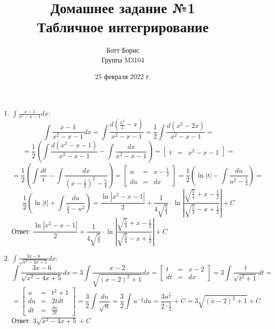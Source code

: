 \documentclass[a4paper,12pt]{article}
\title{Домашнее задание №1\\
    \large Табличное интегрирование}
\author{Ботт Борис\\
    Группа M3104}
\date{25 февраля 2022 г.}
\begin{document}
\maketitle

\begin{enumerate}
    \item $\int\frac{x - 1}{x^2 - x - 1}dx$:
    $$\int\frac{x - 1}{x^2 - x - 1}dx = \int\frac{d(\frac{x^2}{2} - x)}{x^2 - x - 1} = \frac{1}{2}\int\frac{d(x^2 - 2x)}{x^2 - x - 1} =$$
    $$= \frac{1}{2}\left(\int\frac{d(x^2 - x - 1)}{x^2 - x - 1} - \int\frac{dx}{x^2 - x - 1}\right) = \left[\begin{array}{rcl}
        t & = & x^2 - x - 1
    \end{array}\right] =$$
    $$= \frac{1}{2}\left(\int\frac{dt}{t} - \int\frac{dx}{\left(x - \frac{1}{2}\right)^2 - \frac{5}{4}}\right) = \left[\begin{array}{rcl}
        u & = & x - \frac{1}{2} \\
        du & = & dx
    \end{array}\right] = \frac{1}{2}\left(\ln|t| - \int\frac{du}{u^2 - \frac{5}{4}}\right) =$$
    $$\frac{1}{2}\left(\ln|t| + \int\frac{du}{\frac{5}{4} - u^2}\right) = \dfrac{\ln|x^2 - x - 1|}{2} + \dfrac{1}{4\sqrt{\frac{5}{4}}}\cdot\ln\left|\dfrac{\sqrt{\frac{5}{4}} + x - \frac{1}{2}}{\sqrt{\frac{5}{4}} - x + \frac{1}{2}}\right|{} + C$$
    Ответ: $\dfrac{\ln|x^2 - x - 1|}{2} + \dfrac{1}{4\sqrt{\frac{5}{4}}}\cdot\ln\left|\dfrac{\sqrt{\frac{5}{4}} + x - \frac{1}{2}}{\sqrt{\frac{5}{4}} - x + \frac{1}{2}}\right|{} + C$

    \item $\int\frac{3x - 6}{\sqrt{x^2 - 4x + 5}}dx$:
    $$\int\dfrac{3x - 6}{\sqrt{x^2 - 4x + 5}}dx = 3\int\dfrac{x - 2}{\sqrt{\left(x - 2\right)^2 + 1}}dx = \left[\begin{array}{rcl}
        t & = & x - 2 \\
        dt & = & dx
    \end{array}\right] = 3\int\dfrac{t}{\sqrt{t^2 + 1}}dt =$$
    $$= \left[\begin{array}{rcl}
        u & = & t^2 + 1 \\
        du & = & 2tdt \\
        dt & = & \frac{du}{2t}
    \end{array}\right] = \frac{3}{2}\int\dfrac{du}{\sqrt{u}} = \frac{3}{2}\int u^{-\frac{1}{2}}du = \frac{3u^{\frac{1}{2}}}{2\cdot\frac{1}{2}} + C = 3\sqrt{(x - 2)^2 + 1}  + C$$
    Ответ: $3\sqrt{x^2 - 4x + 5}  + C$


\end{enumerate}
\end{document}
